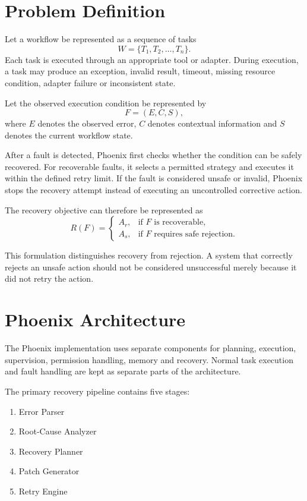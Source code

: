 \documentclass[conference]{IEEEtran}
\begin{document}
\section{Problem Definition}
Let a workflow be represented as a sequence of tasks
\begin{equation}
W = \{T_1, T_2, \dots, T_n\}.
\end{equation}
Each task is executed through an appropriate tool or adapter. During execution, a task may produce an exception, invalid result, timeout, missing resource condition, adapter failure or inconsistent state.

Let the observed execution condition be represented by
\begin{equation}
F = (E, C, S),
\end{equation}
where $E$ denotes the observed error, $C$ denotes contextual information and $S$ denotes the current workflow state.

After a fault is detected, Phoenix first checks whether the condition can be safely recovered. For recoverable faults, it selects a permitted strategy and executes it within the defined retry limit. If the fault is considered unsafe or invalid, Phoenix stops the recovery attempt instead of executing an uncontrolled corrective action.

The recovery objective can therefore be represented as
\begin{equation}
R(F) = \begin{cases}
A_r, & \text{if } F \text{ is recoverable,} \\
A_s, & \text{if } F \text{ requires safe rejection.}
\end{cases}
\end{equation}

This formulation distinguishes recovery from rejection. A system that correctly rejects an unsafe action should not be considered unsuccessful merely because it did not retry the action.

\section{Phoenix Architecture}
The Phoenix implementation uses separate components for planning, execution, supervision, permission handling, memory and recovery. Normal task execution and fault handling are kept as separate parts of the architecture.

The primary recovery pipeline contains five stages:
\begin{enumerate}
    \item Error Parser
    \item Root-Cause Analyzer
    \item Recovery Planner
    \item Patch Generator
    \item Retry Engine
\end{enumerate}
\end{document}
